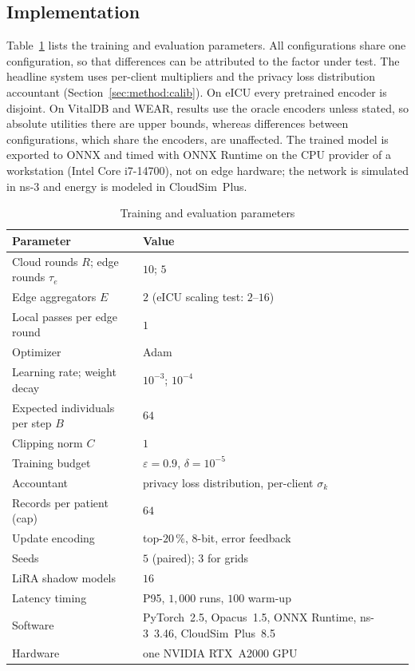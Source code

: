 \subsection{Implementation}
Table~\ref{tab:params} lists the training and evaluation parameters. All configurations
share one configuration, so that differences can be attributed to the factor
under test. The headline system uses per-client multipliers and the privacy
loss distribution accountant (Section~\ref{sec:method:calib}). On eICU every
pretrained encoder is disjoint. On VitalDB and WEAR, results use the oracle
encoders unless stated, so absolute utilities there are upper bounds, whereas
differences between configurations, which share the encoders, are unaffected. The
trained model is exported to ONNX and timed with ONNX Runtime on the CPU
provider of a workstation (Intel Core i7-14700), not on edge hardware; the network is simulated in ns-3 and energy is modeled in
CloudSim~Plus.

\begin{table}[!t]
\centering
\caption{Training and evaluation parameters}
\label{tab:params}
\footnotesize
\setlength{\tabcolsep}{4pt}
\begin{tabular}{@{}p{}p{}@{}}
\toprule
Parameter & Value \\
\midrule
Cloud rounds $R$; edge rounds $\tau_e$ & $10$; $5$ \\
Edge aggregators $E$ & $2$ (eICU scaling test: $2$--$16$) \\
Local passes per edge round & $1$ \\
Optimizer & Adam \\
Learning rate; weight decay & $10^{-3}$; $10^{-4}$ \\
Expected individuals per step $B$ & $64$ \\
Clipping norm $C$ & $1$ \\
Training budget & $\varepsilon = 0.9$, $\delta = 10^{-5}$ \\
Accountant & privacy loss distribution, per-client $\sigma_k$ \\
Records per patient (cap) & $64$ \\
Update encoding & top-$20\,\%$, $8$-bit, error feedback \\
Seeds & $5$ (paired); $3$ for grids \\
LiRA shadow models & $16$ \\
Latency timing & P95, $1{,}000$ runs, $100$ warm-up \\
Software & PyTorch~2.5, Opacus~1.5, ONNX Runtime, ns-3~3.46, CloudSim~Plus~8.5 \\
Hardware & one NVIDIA RTX~A2000 GPU \\
\bottomrule
\end{tabular}
\end{table}

